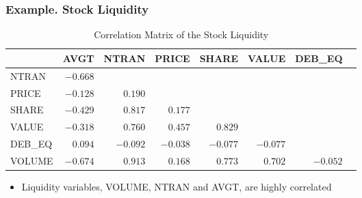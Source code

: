 \begin{frame}%
 \frametitle{Example. Stock Liquidity}
 \begin{table}[h]

\caption{\label{T5:LiquidCorr} Correlation Matrix of the Stock
Liquidity}
\begin{tabular}{lrrrrrrr}
\hline & AVGT & NTRAN & PRICE & SHARE & VALUE & DEB\_EQ \\ \hline
\multicolumn{1}{l}{NTRAN} & $-0.668$ &  &  &  &  &  \\
\multicolumn{1}{l}{PRICE} & $-0.128$ & $0.190$ &  &  &  &  \\
\multicolumn{1}{l}{SHARE} & $-0.429$ & $0.817$ & $0.177$ &  &  &  \\
\multicolumn{1}{l}{VALUE} & $-0.318$ & $0.760$ & $0.457$ & $0.829$ &  &  \\
\multicolumn{1}{l}{DEB\_EQ} & $0.094$ & $-0.092$ & $-0.038$ & $-0.077$ & $%
-0.077$ &  \\
\multicolumn{1}{l}{VOLUME} & $-0.674$ & $0.913$ & $0.168$ & $0.773$
& $0.702$ & $-0.052$ \\ \hline
\end{tabular}
\end{table}
 \begin{itemize}
   \item Liquidity variables, VOLUME, NTRAN and AVGT, are highly
   correlated

    \end{itemize}
\end{frame}

